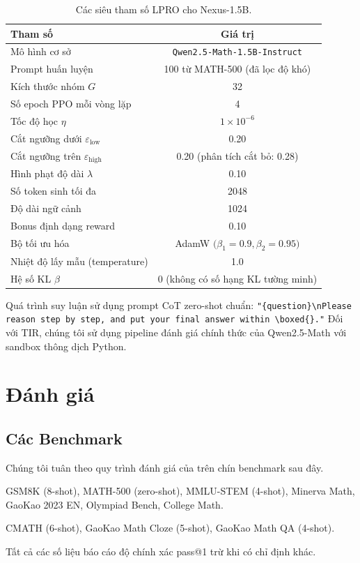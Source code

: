 \documentclass[11pt,a4paper]{article}
\begin{document}
\begin{table}[h]
\centering
\caption{Các siêu tham số LPRO cho Nexus-1.5B.}
\label{tab:hyper}
\begin{tabular}{lc}
\toprule
Tham số & Giá trị \\
\midrule
Mô hình cơ sở & \texttt{Qwen2.5-Math-1.5B-Instruct} \\
Prompt huấn luyện & 100 từ MATH-500 (đã lọc độ khó) \\
Kích thước nhóm \(G\) & 32 \\
Số epoch PPO mỗi vòng lặp & 4 \\
Tốc độ học \(\eta\) & \(1\times 10^{-6}\) \\
Cắt ngưỡng dưới \(\varepsilon_{\text{low}}\) & 0.20 \\
Cắt ngưỡng trên \(\varepsilon_{\text{high}}\) & 0.20 (phân tích cắt bỏ: 0.28) \\
Hình phạt độ dài \(\lambda\) & 0.10 \\
Số token sinh tối đa & 2048 \\
Độ dài ngữ cảnh & 1024 \\
Bonus định dạng reward & 0.10 \\
Bộ tối ưu hóa & AdamW \(\bigl(\beta_1=0.9,\beta_2=0.95\bigr)\) \\
Nhiệt độ lấy mẫu (temperature) & 1.0 \\
Hệ số KL \(\beta\) & 0 (không có số hạng KL tường minh) \\
\bottomrule
\end{tabular}
\end{table}

Quá trình suy luận sử dụng prompt CoT zero-shot chuẩn:
\texttt{"\{question\}\textbackslash nPlease reason step by step, and put your final
answer within \textbackslash boxed\{\}."} Đối với TIR, chúng tôi sử dụng
pipeline đánh giá chính thức của Qwen2.5-Math với sandbox thông dịch Python.

\section{Đánh giá}

\subsection{Các Benchmark}

Chúng tôi tuân theo quy trình đánh giá của \citet{yang2024qwen25math} trên
chín benchmark sau đây.
\begin{description}[leftmargin=*,style=nextline]
  \item[Tiếng Anh (CoT và TIR):] GSM8K (8-shot), MATH-500 (zero-shot), MMLU-STEM
        (4-shot), Minerva Math, GaoKao 2023 EN, Olympiad Bench, College Math.
  \item[Tiếng Trung (CoT):] CMATH (6-shot), GaoKao Math Cloze (5-shot), GaoKao Math QA
        (4-shot).
\end{description}
Tất cả các số liệu báo cáo độ chính xác pass@1 trừ khi có chỉ định khác.
\end{document}
